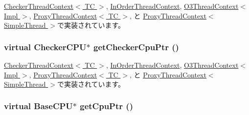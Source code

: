 \hyperlink{classCheckerThreadContext_a5adc7d32f3a8bd75c5dc0a62d95564fd}{CheckerThreadContext$<$ TC $>$}, \hyperlink{classInOrderThreadContext_a5adc7d32f3a8bd75c5dc0a62d95564fd}{InOrderThreadContext}, \hyperlink{classO3ThreadContext_a5adc7d32f3a8bd75c5dc0a62d95564fd}{O3ThreadContext$<$ Impl $>$}, \hyperlink{classProxyThreadContext_a5adc7d32f3a8bd75c5dc0a62d95564fd}{ProxyThreadContext$<$ TC $>$}, と \hyperlink{classProxyThreadContext_a5adc7d32f3a8bd75c5dc0a62d95564fd}{ProxyThreadContext$<$ SimpleThread $>$}で実装されています。\hypertarget{classThreadContext_a78c10882b34a6238eac936f6913f9918}{
\subsubsection[{getCheckerCpuPtr}]{\setlength{\rightskip}{0pt plus 5cm}virtual {\bf CheckerCPU}$\ast$ getCheckerCpuPtr ()}}
\label{classThreadContext_a78c10882b34a6238eac936f6913f9918}


\hyperlink{classCheckerThreadContext_a0807ebbe39e158fdf6007ca00e3f7252}{CheckerThreadContext$<$ TC $>$}, \hyperlink{classInOrderThreadContext_a0807ebbe39e158fdf6007ca00e3f7252}{InOrderThreadContext}, \hyperlink{classO3ThreadContext_a0807ebbe39e158fdf6007ca00e3f7252}{O3ThreadContext$<$ Impl $>$}, \hyperlink{classProxyThreadContext_a0807ebbe39e158fdf6007ca00e3f7252}{ProxyThreadContext$<$ TC $>$}, と \hyperlink{classProxyThreadContext_a0807ebbe39e158fdf6007ca00e3f7252}{ProxyThreadContext$<$ SimpleThread $>$}で実装されています。\hypertarget{classThreadContext_ad10a7ef049c2d2ffadfc809341e66d4e}{
\subsubsection[{getCpuPtr}]{\setlength{\rightskip}{0pt plus 5cm}virtual {\bf BaseCPU}$\ast$ getCpuPtr ()}}
\label{classThreadContext_ad10a7ef049c2d2ffadfc809341e66d4e}


